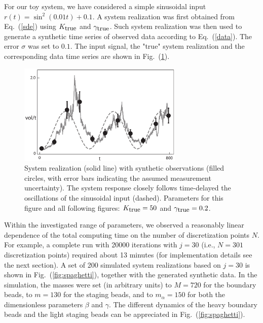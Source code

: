 \documentclass[11pt]{article}
\theoremstyle{definition}
\begin{document}
For our toy system, we have considered a simple sinusoidal input  $r(t) = \sin^2 \left( 0.01 t \right) + 0.1$. A system realization was first obtained from Eq.~(\ref{sde}) using $K_{\mbox{\small true}}$ and $\gamma_{\mbox{\small true}}$. 
Such system realization was then used to generate a synthetic time series of observed data according to Eq.~(\ref{data}). The error $\sigma$ was set to $0.1$. The input signal, the "true" system realization and the corresponding data time series are shown in Fig.~(\ref{fig:rain_data_S}). 
\begin{figure}[htb!]
    \centering
    \includegraphics[width=0.7\textwidth]{Fig2.pdf}
    \caption{\label{fig:rain_data_S} 
    System realization (solid line) with synthetic observations (filled circles, with error bars indicating the assumed measurement uncertainty).
    The system response closely follows time-delayed the oscillations of the sinusoidal input (dashed).
    Parameters for this figure and all following figures: $K_{\mbox{\small true}} = 50$ and $\gamma_{\mbox{\small true}} = 0.2$.
}
\end{figure}
Within the investigated range of parameters, we observed a reasonably linear dependence of the total computing time on the number of discretization points $N$. For example, a complete run with 20000 iterations with $j=30$ (i.e., $N = 301$ discretization points) required about 13 minutes (for implementation details see the next section). A set of 200 simulated system realizations based on $j=30$ is shown in Fig.~(\ref{fig:spaghetti}), together with the generated synthetic data. In the simulation, the masses were set (in arbitrary units) to $M=720$ for the boundary beads, to $m=130$ for the staging beads, and to $m_\alpha=150$ for both the dimensionless parameters $\beta$ and $\gamma$. The different dynamics of the heavy boundary beads and the light staging beads can be appreciated in Fig.~(\ref{fig:spaghetti}).
\end{document}
